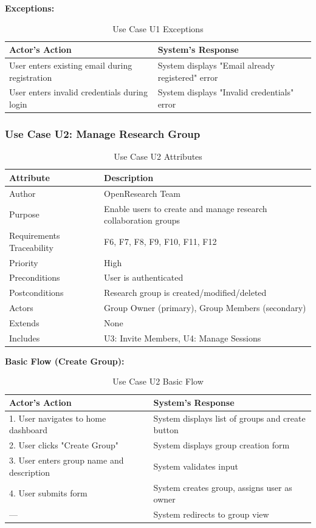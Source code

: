\documentclass[11pt,a4paper]{article}
\begin{document}
\textbf{Exceptions:}

\begin{table}[H]
\centering
\begin{tabular}{p{6cm}p{7cm}}
\toprule
\textbf{Actor's Action} & \textbf{System's Response} \\
\midrule
User enters existing email during registration & System displays "Email already registered" error \\
User enters invalid credentials during login & System displays "Invalid credentials" error \\
\bottomrule
\end{tabular}
\caption{Use Case U1 Exceptions}
\end{table}

\subsubsection{Use Case U2: Manage Research Group}

\begin{table}[H]
\centering
\begin{tabular}{p{4cm}p{9cm}}
\toprule
\textbf{Attribute} & \textbf{Description} \\
\midrule
Author & OpenResearch Team \\
Purpose & Enable users to create and manage research collaboration groups \\
Requirements Traceability & F6, F7, F8, F9, F10, F11, F12 \\
Priority & High \\
Preconditions & User is authenticated \\
Postconditions & Research group is created/modified/deleted \\
Actors & Group Owner (primary), Group Members (secondary) \\
Extends & None \\
Includes & U3: Invite Members, U4: Manage Sessions \\
\bottomrule
\end{tabular}
\caption{Use Case U2 Attributes}
\end{table}

\textbf{Basic Flow (Create Group):}

\begin{table}[H]
\centering
\begin{tabular}{p{6cm}p{7cm}}
\toprule
\textbf{Actor's Action} & \textbf{System's Response} \\
\midrule
1. User navigates to home dashboard & System displays list of groups and create button \\
2. User clicks "Create Group" & System displays group creation form \\
3. User enters group name and description & System validates input \\
4. User submits form & System creates group, assigns user as owner \\
--- & System redirects to group view \\
\bottomrule
\end{tabular}
\caption{Use Case U2 Basic Flow}
\end{table}
\end{document}
